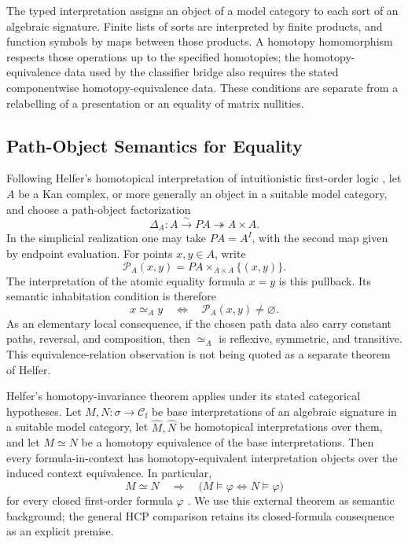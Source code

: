 The typed interpretation assigns an object of a
model category to each sort of an algebraic signature. Finite lists of sorts
are interpreted by finite products, and function symbols by maps between
those products. A homotopy homomorphism respects those operations up to the
specified homotopies; the homotopy-equivalence data used by the classifier bridge
also requires the stated componentwise homotopy-equivalence data. These
conditions are separate from a relabelling of a presentation or an equality
of matrix nullities.

\subsection{Path-Object Semantics for Equality}

Following Helfer's homotopical interpretation of intuitionistic first-order
logic \cite[Section~2 and Definitions~6.3 and~6.6]{helfer2019fol}, let \(A\)
be a Kan complex, or more generally an object in a suitable model category,
and choose a path-object factorization
\[
  \Delta_A:A\overset{\sim}{\longrightarrow}PA
  \twoheadrightarrow A\times A.
\]
In the simplicial realization one may take \(PA=A^I\), with the second map
given by endpoint evaluation. For points \(x,y\in A\), write
\[
  \mathcal P_A(x,y)
  = PA\times_{A\times A}\{(x,y)\}.
\]
The interpretation of the atomic equality formula \(x=y\) is this pullback.
Its semantic inhabitation condition is therefore
\[
  x\simeq_A y
  \quad\Longleftrightarrow\quad
  \mathcal P_A(x,y)\neq\varnothing .
\]
As an elementary local consequence, if the chosen path data also carry
constant paths, reversal, and composition, then \(\simeq_A\) is reflexive,
symmetric, and transitive. This equivalence-relation observation is not being
quoted as a separate theorem of Helfer.

Helfer's homotopy-invariance theorem applies under its stated categorical
hypotheses. Let \(M,N:\sigma\to\mathcal C_{\mathrm f}\) be base
interpretations of an algebraic signature in a suitable model category, let
\(\widehat M,\widehat N\) be homotopical interpretations over them, and let
\(M\simeq N\) be a homotopy equivalence of the base interpretations. Then every
formula-in-context has homotopy-equivalent interpretation objects over the
induced context equivalence. In particular,
\[
  M\simeq N
  \quad\Longrightarrow\quad
  \bigl(M\models\varphi \Longleftrightarrow N\models\varphi\bigr)
\]
for every closed first-order formula \(\varphi\)
\cite[Definition~7.1 and Theorem~12.3]{helfer2019fol}. We use this external
theorem as semantic background; the general HCP comparison retains its
closed-formula consequence as an explicit premise.

